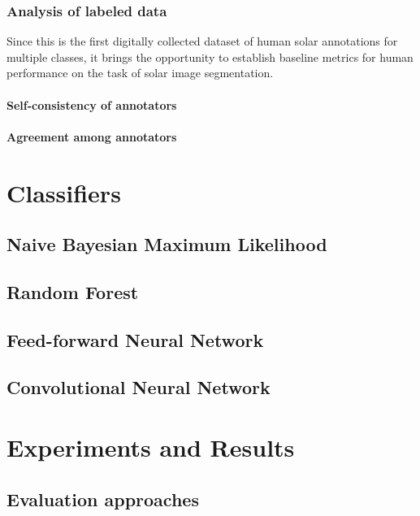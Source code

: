 \documentclass[twoside]{report}
\begin{document}
\subsection{Analysis of labeled data}
Since this is the first digitally collected dataset of human solar annotations for multiple classes, it brings the opportunity to establish baseline metrics for human performance on the task of solar image segmentation. 

\subsubsection{Self-consistency of annotators} \label{sec:consistency}

\subsubsection{Agreement among annotators} \label{sec:agreement}

\chapter{Classifiers} \label{ch:classifiers}

\section{Naive Bayesian Maximum Likelihood}

\section{Random Forest}

\section{Feed-forward Neural Network}

\section{Convolutional Neural Network}

\chapter{Experiments and Results} \label{ch:experiments}

\section{Evaluation approaches}
\end{document}
